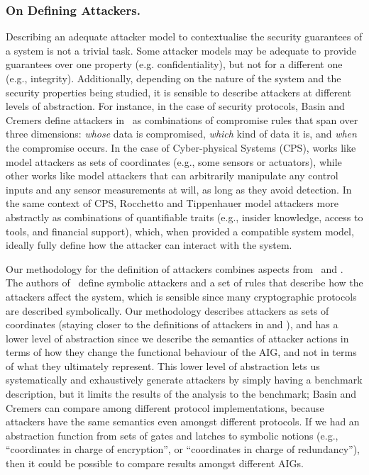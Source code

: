 {\subsubsection{On Defining Attackers.} Describing an adequate attacker model to contextualise the security guarantees of a system is not a trivial task. Some attacker models may be adequate to provide guarantees over one property (e.g. confidentiality), but not for a different one (e.g., integrity). Additionally, depending on the nature of the system and the security properties being studied, it is sensible to describe attackers at different levels of abstraction. For instance, in the case of security protocols, Basin and Cremers define attackers in~\cite{KnowYourEnemy} as combinations of compromise rules that span over three dimensions:  \emph{whose} data is compromised, \emph{which} kind of data it is, and \emph{when} the compromise occurs. In the case of Cyber-physical Systems (CPS), works like \cite{Giraldo2018,Simei} model attackers as sets of coordinates (e.g., some sensors or  actuators), while other works like \cite{IFCPSSec,Cardenas2011,Urbina2016} model attackers that can arbitrarily manipulate any control inputs and any sensor measurements at will, as long as they avoid detection. In the same context of CPS, Rocchetto and Tippenhauer \cite{CPSProfiles} model attackers more abstractly as combinations of quantifiable traits (e.g., insider knowledge, access to tools, and financial support), which, when provided a compatible system model, ideally fully define how the attacker can interact with the system. 

Our methodology for the definition of attackers combines aspects from~\cite{KnowYourEnemy,Giraldo2018} and \cite{Simei}. The authors of~\cite{KnowYourEnemy} define symbolic attackers and a set of rules that describe how the attackers affect the system, which is sensible since many cryptographic protocols are described symbolically. Our methodology describes attackers as sets of coordinates (staying closer to the definitions of attackers in \cite{Giraldo2018} and \cite{Simei}), and has a lower level of abstraction since we describe the semantics of attacker actions in terms of how they change the functional behaviour of the AIG, and not in terms of what they ultimately represent. This lower level of abstraction lets us systematically and exhaustively generate attackers by simply having a benchmark description, but it limits the results of the analysis to the benchmark; Basin and Cremers can compare among different protocol implementations, because attackers have the same semantics even amongst different protocols. If we had an abstraction function from sets of gates and latches to symbolic notions (e.g., ``coordinates in charge of encryption'', or ``coordinates in charge of redundancy''), then it could be possible to compare results amongst different AIGs.

}
